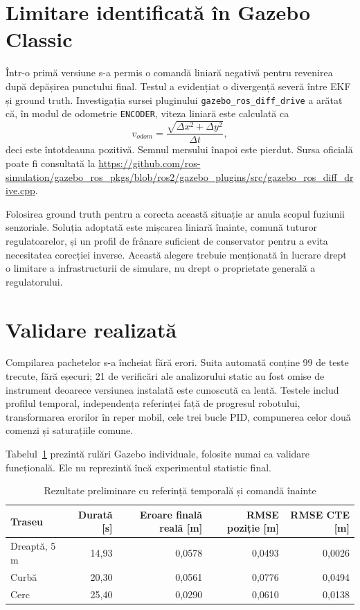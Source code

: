 \documentclass[12pt,a4paper]{article}
\begin{document}
\section{Limitare identificată în Gazebo Classic}

Într-o primă versiune s-a permis o comandă liniară negativă pentru revenirea
după depășirea punctului final. Testul a evidențiat o divergență severă între
EKF și ground truth. Investigația sursei pluginului
\texttt{gazebo\_ros\_diff\_drive} a arătat că, în modul de odometrie
\texttt{ENCODER}, viteza liniară este calculată ca
\begin{equation}
  v_{odom}=\frac{\sqrt{\Delta x^2+\Delta y^2}}{\Delta t},
\end{equation}
deci este întotdeauna pozitivă. Semnul mersului înapoi este pierdut. Sursa
oficială poate fi consultată la
\url{https://github.com/ros-simulation/gazebo_ros_pkgs/blob/ros2/gazebo_plugins/src/gazebo_ros_diff_drive.cpp}.

Folosirea ground truth pentru a corecta această situație ar anula scopul
fuziunii senzoriale. Soluția adoptată este mișcarea liniară înainte, comună
tuturor regulatoarelor, și un profil de frânare suficient de conservator pentru
a evita necesitatea corecției inverse. Această alegere trebuie menționată în
lucrare drept o limitare a infrastructurii de simulare, nu drept o proprietate
generală a regulatorului.

\section{Validare realizată}

Compilarea pachetelor s-a încheiat fără erori. Suita automată conține 99 de
teste trecute, fără eșecuri; 21 de verificări ale analizorului static au fost
omise de instrument deoarece versiunea instalată este cunoscută ca lentă.
Testele includ profilul temporal, independența referinței față de progresul
robotului, transformarea erorilor în reper mobil, cele trei bucle PID, compunerea
celor două comenzi și saturațiile comune.

Tabelul~\ref{tab:smoke} prezintă rulări Gazebo individuale, folosite numai ca
validare funcțională. Ele nu reprezintă încă experimentul statistic final.

\begin{table}[h]
\centering
\caption{Rezultate preliminare cu referință temporală și comandă înainte}
\label{tab:smoke}
\begin{tabular}{lrrrr}
\toprule
Traseu & Durată [s] & Eroare finală reală [m] & RMSE poziție [m] & RMSE CTE [m]\\
\midrule
Dreaptă, 5 m & 14,93 & 0,0578 & 0,0493 & 0,0026\\
Curbă & 20,30 & 0,0561 & 0,0776 & 0,0494\\
Cerc & 25,40 & 0,0290 & 0,0610 & 0,0138\\
\bottomrule
\end{tabular}
\end{table}
\end{document}
